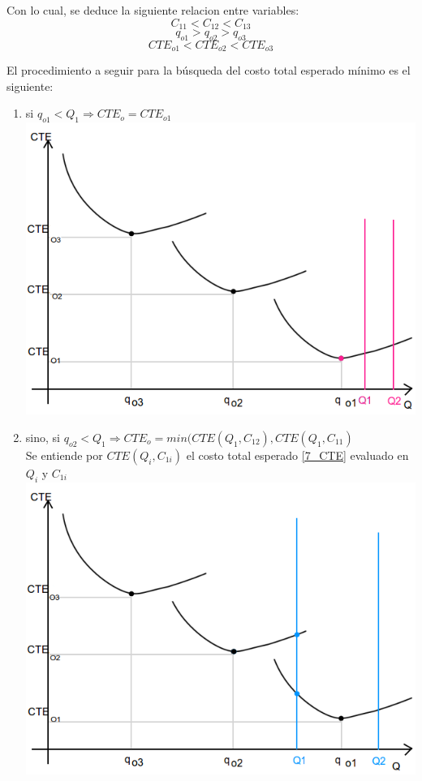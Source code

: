 \documentclass[a4paper,10pt]{article}
\begin{document}
Con lo cual, se deduce la siguiente relacion entre variables:
 $$ C_{11} < C_{12} < C_{13} $$
 $$ q_{o1} > q_{o2} > q_{o3}$$
 $$ CTE_{o1} < CTE_{o2} < CTE_{o3} $$
 
El procedimiento a seguir para la búsqueda del costo total esperado mínimo es el siguiente: 
\begin{enumerate}
 \item si $q_{o1} < Q_1 \Rightarrow CTE_o = CTE_{o1}$ \\
      \includegraphics[scale=0.4,keepaspectratio=true]{img/7/7_QvsCTE_1.png} 
 \item sino, si $ q_{o2} < Q_1 \Rightarrow CTE_o = min( CTE(Q_1, C_{12}), CTE(Q_1, C_{11})$ \\
       Se entiende por $CTE(Q_i, C_{1i})$ el costo total esperado \eqref{7_CTE} evaluado en $Q_i$ y $C_{1i}$ \\
      \includegraphics[scale=0.4,keepaspectratio=true]{img/7/7_QvsCTE_2.png} 

\end{enumerate}
\end{document}
